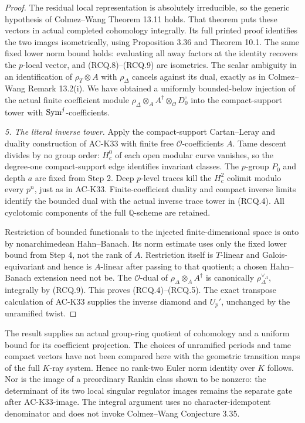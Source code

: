 \begin{proof}
The residual local representation is absolutely irreducible, so
the generic hypothesis of Colmez--Wang Theorem 13.11 holds.
That theorem puts these vectors in actual completed cohomology
integrally. Its full printed proof identifies the two images
isometrically, using Proposition 3.36 and Theorem 10.1.
The same fixed lower norm bound holds: evaluating all away factors
at the identity recovers the \(p\)-local vector, and (RCQ.8)--(RCQ.9)
are isometries. The scalar ambiguity in an identification of
\(\rho_T\otimes A\) with \(\rho_\Delta\) cancels against its dual,
exactly as in Colmez--Wang Remark 13.2(i).
We have obtained a uniformly bounded-below injection of the actual
finite coefficient module
\(\rho_\Delta\otimes_A A^\dagger\otimes_{\mathcal O}D_0^\circ\)
into the compact-support tower with \({\rm Sym}^j\)-coefficients.

\textit{5. The literal inverse tower.}
Apply the compact-support Cartan--Leray and duality construction of
AC-K33 with finite free \(\mathcal O\)-coefficients \(A\).
Tame descent divides by no group order: \(H_c^0\) of each open
modular curve vanishes, so the degree-one compact-support edge
identifies invariant classes. The \(p\)-group \(P_0\) and depth
\(a\) are fixed from Step 2. Deep \(p\)-level traces kill the
\(H_c^2\) colimit modulo every \(p^n\), just as in AC-K33.
Finite-coefficient duality and compact inverse limits identify the
bounded dual with the actual inverse trace tower in (RCQ.4).
All cyclotomic components of the full \(\mathbb Q\)-scheme are retained.

Restriction of bounded functionals to the injected finite-dimensional
space is onto by nonarchimedean Hahn--Banach. Its norm estimate uses
only the fixed lower bound from Step 4, not the rank of \(A\).
Restriction itself is \(T\)-linear and Galois-equivariant and hence
is \(A\)-linear after passing to that quotient; a chosen
Hahn--Banach extension need not be.
The \(\mathcal O\)-dual of
\(\rho_\Delta\otimes_A A^\dagger\) is canonically
\(\rho_\Delta^{\vee_A}\), integrally by (RCQ.9).
This proves (RCQ.4)--(RCQ.5).
The exact transpose calculation of AC-K33 supplies the inverse
diamond and \(U_p'\), unchanged by the unramified twist.
\end{proof}

\begin{remark}
The result supplies an actual group-ring quotient of cohomology
and a uniform bound for its coefficient projection.
The choices of unramified periods and tame compact vectors have
not been compared here with the geometric transition maps of the
full \(K\)-ray system. Hence no rank-two Euler norm identity over
\(K\) follows. Nor is the image of a preordinary Rankin class shown
to be nonzero: the determinant of its two local singular regulator
images remains the separate gate after AC-K33-image.
The integral argument uses no character-idempotent denominator and
does not invoke Colmez--Wang Conjecture 3.35.
\end{remark}
